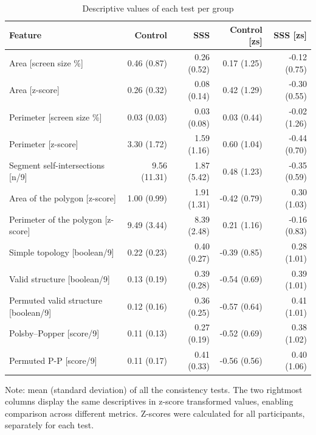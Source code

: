 \documentclass[
  man,
  floatsintext,
  longtable,
  a4paper,
  nolmodern,
  notxfonts,
  notimes,
  colorlinks=true,linkcolor=blue,citecolor=blue,urlcolor=blue]{apa7}
\begin{document}
\begin{table}

{\caption{{Descriptive values of each test per group}{\label{tbl-04}}}
\vspace{-20pt}}

\fontsize{12.0pt}{14.0pt}\selectfont
\begin{tabular*}{\linewidth}{@{\extracolsep{\fill}}lrrrr}
\toprule
Feature & Control & SSS & Control [zs] & SSS [zs] \\ 
\midrule\addlinespace[2.5pt]
Area [screen size \%] & 0.46 (0.87) & 0.26 (0.52) & 0.17 (1.25) & -0.12 (0.75) \\ 
Area [z-score] & 0.26 (0.32) & 0.08 (0.14) & 0.42 (1.29) & -0.30 (0.55) \\ 
Perimeter [screen size \%] & 0.03 (0.03) & 0.03 (0.08) & 0.03 (0.44) & -0.02 (1.26) \\ 
Perimeter [z-score] & 3.30 (1.72) & 1.59 (1.16) & 0.60 (1.04) & -0.44 (0.70) \\ 
Segment self-intersections [n/9] & 9.56 (11.31) & 1.87 (5.42) & 0.48 (1.23) & -0.35 (0.59) \\ 
Area of the polygon [z-score] & 1.00 (0.99) & 1.91 (1.31) & -0.42 (0.79) & 0.30 (1.03) \\ 
Perimeter of the polygon [z-score] & 9.49 (3.44) & 8.39 (2.48) & 0.21 (1.16) & -0.16 (0.83) \\ 
Simple topology [boolean/9] & 0.22 (0.23) & 0.40 (0.27) & -0.39 (0.85) & 0.28 (1.01) \\ 
Valid structure [boolean/9] & 0.13 (0.19) & 0.39 (0.28) & -0.54 (0.69) & 0.39 (1.01) \\ 
Permuted valid structure [boolean/9] & 0.12 (0.16) & 0.36 (0.25) & -0.57 (0.64) & 0.41 (1.01) \\ 
Polsby–Popper [score/9] & 0.11 (0.13) & 0.27 (0.19) & -0.52 (0.69) & 0.38 (1.02) \\ 
Permuted P-P [score/9] & 0.11 (0.17) & 0.41 (0.33) & -0.56 (0.56) & 0.40 (1.06) \\ 
\bottomrule
\end{tabular*}
\begin{minipage}{\linewidth}
\vspace{.05em}
Note: mean (standard deviation) of all the consistency tests. The two rightmost columns display the same descriptives in z-score transformed values, enabling comparison across different metrics. Z-scores were calculated for all participants, separately for each test.\\
\end{minipage}

\end{table}
\end{document}
